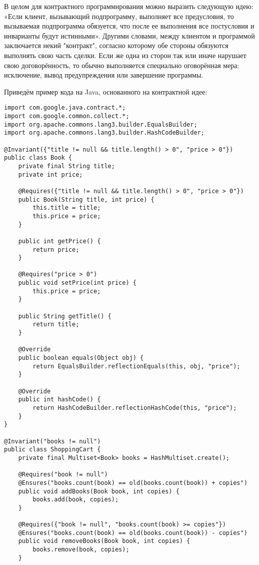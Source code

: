 В целом для контрактного программирования можно выразить следующую идею: «Если клиент, вызывающий подпрограмму, выполняет все предусловия, то вызываемая подпрограмма обязуется, что после ее выполнения все постусловия и инварианты будут истинными». Другими словами, между клиентом и программой заключается некий "контракт", согласно которому обе стороны обязуются выполнять свою часть сделки. Если же одна из сторон так или иначе нарушает свою договорённость, то обычно выполняется специально оговорённая мера: исключение, вывод предупреждения или завершение программы.

Приведём пример кода на Java, основанного на контрактной идее:

\begin{lstlisting}
import com.google.java.contract.*;
import com.google.common.collect.*;
import org.apache.commons.lang3.builder.EqualsBuilder;
import org.apache.commons.lang3.builder.HashCodeBuilder;
 
@Invariant({"title != null && title.length() > 0", "price > 0"})
public class Book {
    private final String title;
    private int price;
 
    @Requires({"title != null && title.length() > 0", "price > 0"})
    public Book(String title, int price) {
        this.title = title;
        this.price = price;
    }
 
    public int getPrice() {
        return price;
    }
 
    @Requires("price > 0")
    public void setPrice(int price) {
        this.price = price;
    }
 
    public String getTitle() {
        return title;
    }
 
    @Override
    public boolean equals(Object obj) {
        return EqualsBuilder.reflectionEquals(this, obj, "price");
    }
 
    @Override
    public int hashCode() {
        return HashCodeBuilder.reflectionHashCode(this, "price");
    }
}

@Invariant("books != null")
public class ShoppingCart {
    private final Multiset<Book> books = HashMultiset.create();
 
    @Requires("book != null")
    @Ensures("books.count(book) == old(books.count(book)) + copies")
    public void addBooks(Book book, int copies) {
        books.add(book, copies);
    }
 
    @Requires({"book != null", "books.count(book) >= copies"})
    @Ensures("books.count(book) == old(books.count(book)) - copies")
    public void removeBooks(Book book, int copies) {
        books.remove(book, copies);
    }
 

\end{lstlisting}

